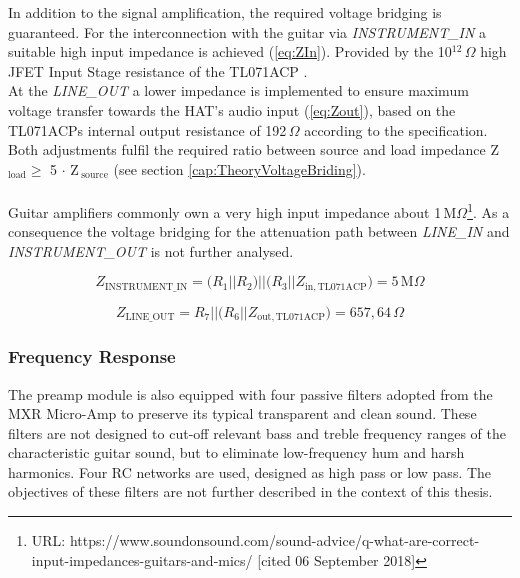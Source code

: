 In addition to the signal amplification, the required voltage bridging is guaranteed. For the interconnection with the guitar via \textit{INSTRUMENT\_IN} a suitable high input impedance is achieved
(\ref{eq:ZIn}). Provided by the 10$^{12}\,\Omega$ high JFET Input Stage resistance of the TL071ACP \cite{Tl071:2017}.\\

At the \textit{LINE\_OUT} a lower impedance is implemented to ensure maximum voltage transfer towards the HAT's audio input (\ref{eq:Zout}), based on the TL071ACPs internal output resistance of 192\,$\Omega$ according to the specification.\\ Both adjustments fulfil the required ratio between source and load impedance Z\,$_{\mathrm{load}} \geq$ 5 $\cdot$ Z\,$_{\mathrm{source}}$ (see section \ref{cap:TheoryVoltageBriding}).\\
\\
Guitar amplifiers commonly own a very high input impedance about 1\,M$\Omega$\footnote{URL: https://www.soundonsound.com/sound-advice/q-what-are-correct-input-impedances-guitars-and-mics/ [cited 06 September 2018]}. As a consequence the voltage bridging for the attenuation path between \textit{LINE\_IN} and \textit{INSTRUMENT\_OUT} is not further analysed. 


\begin{equation}
Z_{\mathrm{INSTRUMENT\_IN}} = \big( R_1 || R_2\big) \Big| \Big| \big( R_3 || Z_{\mathrm{ in,TL071ACP}}\big) = 5\,\mathrm{M}\Omega
\label{eq:ZIn}
\end{equation}

\begin{equation}
Z_{\mathrm{LINE\_OUT}} =  R_7 \Big| \Big| \big( R_6 || Z_{\mathrm{out,TL071ACP}}\big) = 657,64\,\Omega
\label{eq:Zout}
\end{equation}

\subsubsection{Frequency Response}

The preamp module is also equipped with four passive filters adopted from the MXR Micro-Amp to preserve its typical transparent and clean sound. These filters are not designed to cut-off relevant bass and treble frequency ranges of the characteristic guitar sound, but to eliminate low-frequency hum and harsh harmonics.
Four RC networks are used, designed as high pass or low pass. The objectives of these filters are not further described in the context of this thesis.

